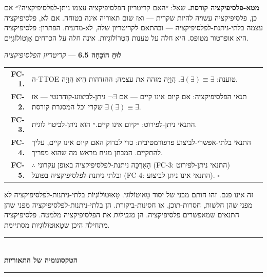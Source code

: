 \documentclass[10pt, openany, oneside]{book}
\renewcommand{\normalsize}{\fontsize{10}{13}\selectfont}
\renewcommand{\footnotesize}{\fontsize{8.5}{11}\selectfont}
\begin{document}
\textbf{מטא-פלסיפיקציה קורסת.} שאל: ״האם קריטריון הפלסיפיקציה עצמו ניתן-לפלסיפיקציה?״ אם כן, פלסיפיקציה עשויה להיות שקרית — ואז שום תאוריה אינה בטוחה. אם לא, פלסיפיקציה עצמה בלתי-ניתנת-לפלסיפיקציה — ובהתאם לקריטריון שלה, לא-מדעית. הפתרון: פלסיפיקציה היא אופרטור מטופס. היא חלה על טענות הֶטֶרוֹלוֹגִיוֹת. אינה חלה על הכרחים אָוְטוֹלוֹגִיִּים.

\vspace{0.5em}

\textbf{לוּחַ הוֹכָחָה 6.5} --- \textit{קריטריון הפלסיפיקציה}

\vspace{0.5em}

{\footnotesize
\noindent\begin{tabular}{r p{}}
\textbf{FC-1.} & ה-TTOE טוענת: $\exists(\exists) \equiv \exists$. הֲוָיָה מזהה את עצמה; ההזדהות הִיא הֲוָיָה. \\[0.3em]
\textbf{FC-2.} & תנאי הפלסיפיקציה: אם קיום אינו קיים — אם $\neg\exists$ ניתן-לביצוע-קוהרנטי — אז $\exists(\exists) \equiv \exists$ שקרי וכל המסגרת קורסת. \\[0.3em]
\textbf{FC-3.} & התנאי ניתן-לפירוט: ״קיום אינו קיים.״ הוא ניתן-לביטוי לוגית. \\[0.3em]
\textbf{FC-4.} & התנאי בלתי-אפשרי-לביצוע פרפורמטיבית: כדי לבדוק האם קיום אינו קיים, עליך להתקיים. המבחן מניח מראש מה שהוא מפריך. \\[0.3em]
\textbf{FC-5.} & $\therefore$ הָאַרְכֵּה ניתנת-לפלסיפיקציה באופן עקרוני (FC-3: התנאי ניתן-לפירוט) ובלתי-ניתנת-לפלסיפיקציה בפועל (FC-4: התנאי אינו ניתן-לביצוע). $\square$ \\[0.3em]
\end{tabular}
}

\vspace{0.8em}

\noindent זה אינו פגם. זהו חותם מבני של יסוד טָאוּטוֹלוֹגִי. טָאוּטוֹלוֹגְיוֹת בלתי-ניתנות-לפלסיפיקציה לא מפני שהן חלשות, חסרות-תוכן, או חסינות-ביקורת. הן בלתי-ניתנות-לפלסיפיקציה מפני שהן התנאים שמאפשרים פלסיפיקציה. הן \textit{מגבילות} את הפלסיפיקציה מלמטה. פלסיפיקציה מתחילה היכן שטָאוּטוֹלוֹגִיוּת מסתיימת.

\vspace{1.5em}


\begin{center}
    \rule{0.3\textwidth}{0.4pt}\\[0.5em]
    {\normalsize\bfseries\textsc{הטקסונומיה של התאוריות}}\\[0.3em]
    \rule{0.3\textwidth}{0.4pt}
\end{center}
\end{document}
